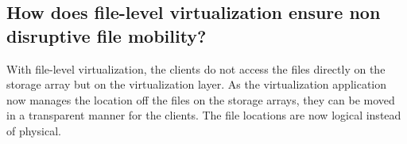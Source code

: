\subsection{How does file-level virtualization ensure non disruptive file mobility?} %
\label{sub:how_does_file_leve_virtualization_ensure_nondisruptive_file_mobility}
	With file-level virtualization,
	the clients do not access the files directly on the storage array
	but on the virtualization layer.
	As the virtualization application now manages the location off the files
	on the storage arrays,
	they can be moved in a transparent manner for the clients.
	The file locations are now logical instead of physical.

